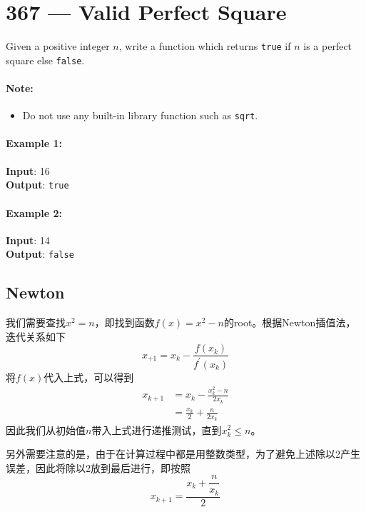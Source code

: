 \section{367 --- Valid Perfect Square}
Given a positive integer $ n $, write a function which returns \texttt{true} if $ n $ is a perfect square else \texttt{false}.

\paragraph{Note:} 
\begin{itemize}
\item Do not use any built-in library function such as \texttt{sqrt}.
\end{itemize}

\paragraph{Example 1:}

\begin{flushleft}
\textbf{Input}: 16
\\
\textbf{Output}: \texttt{true}
\end{flushleft}

\paragraph{Example 2:}

\begin{flushleft}
\textbf{Input}: 14
\\
\textbf{Output}: \texttt{false}
\end{flushleft}

\subsection{Newton}
我们需要查找$x^2=n$，即找到函数$f(x)=x^2-n$的root。根据Newton插值法，迭代关系如下
\[
x_{+1} = x_k - \frac{f(x_k)}{f^{'}(x_k)}
\]
将$f(x)$代入上式，可以得到
\begin{align*}
x_{k+1} &= x_k - \frac{x_{k}^2-n}{2x_k}\\
&=\frac{x_k}{2} + \frac{n}{2x_k}
\end{align*}
因此我们从初始值$n$带入上式进行递推测试，直到$x_k^2\leq n$。
\par
另外需要注意的是，由于在计算过程中都是用整数类型，为了避免上述除以2产生误差，因此将除以2放到最后进行，即按照
\[
x_{k+1} = \dfrac{x_k + \dfrac{n}{x_k}}{2}
\]


